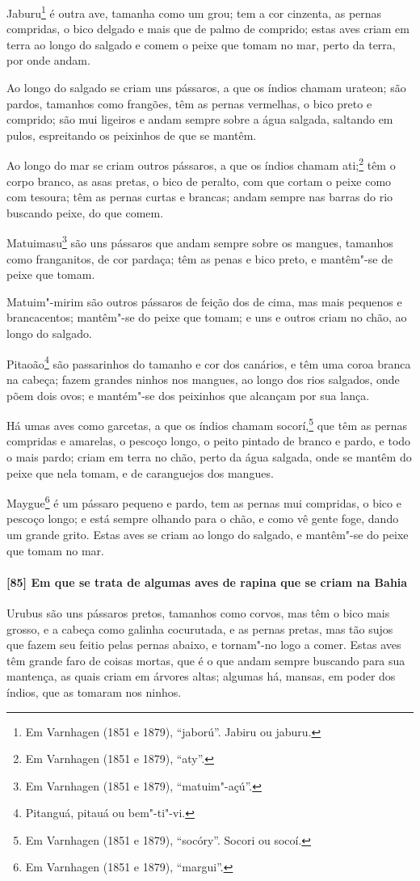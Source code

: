 \begin{linenumbers}
Jaburu\footnote{ Em Varnhagen (1851 e 1879), ``jaború''. Jabiru ou jaburu.} é outra ave,
tamanha como um grou; tem a cor cinzenta, as pernas compridas, o bico delgado e mais que
de palmo de comprido; estas aves criam em terra ao longo do salgado e comem o peixe que
tomam no mar, perto da terra, por onde andam.

Ao longo do salgado se criam uns pássaros, a que os índios chamam urateon; são pardos,
tamanhos como frangões, têm as pernas vermelhas, o bico preto e comprido; são mui ligeiros
e andam sempre sobre a água salgada, saltando em pulos, espreitando os peixinhos de que se
mantêm.

Ao longo do mar se criam outros pássaros, a que os índios chamam ati;\footnote{ Em
Varnhagen (1851 e 1879), ``aty''.} têm o corpo branco, as asas pretas, o bico de
peralto, com que cortam o peixe como com tesoura; têm as pernas curtas e brancas; andam
sempre nas barras do rio buscando peixe, do que comem.

Matuimasu\footnote{ Em Varnhagen (1851 e 1879), ``matuim"-açú''.} são uns pássaros que
andam sempre sobre os mangues, tamanhos como franganitos, de cor pardaça; têm as penas e
bico preto, e mantêm"-se de peixe que tomam.

Matuim"-mirim são outros pássaros de feição dos de cima, mas mais pequenos e brancacentos;
mantêm"-se do peixe que tomam; e uns e outros criam no chão, ao longo do salgado.

Pitaoão\footnote{ Pitanguá, pitauá ou bem"-ti"-vi.} são passarinhos do tamanho e cor dos
canários, e têm uma coroa branca na cabeça; fazem grandes ninhos nos mangues, ao longo dos
rios salgados, onde põem dois ovos; e mantém"-se dos peixinhos que alcançam por sua lança.

Há umas aves como garcetas, a que os índios chamam socorí,\footnote{ Em Varnhagen (1851 e
1879), ``socóry''. Socori ou socoí.} que têm as pernas compridas e amarelas, o pescoço
longo, o peito pintado de branco e pardo, e todo o mais pardo; criam em terra no chão,
perto da água salgada, onde se mantêm do peixe que nela tomam, e de caranguejos dos
mangues.

Maygue\footnote{ Em Varnhagen (1851 e 1879), ``margui''.} é um pássaro pequeno e pardo,
tem as pernas mui compridas, o bico e pescoço longo; e está sempre olhando para o chão, e
como vê gente foge, dando um grande grito. Estas aves se criam ao longo do salgado, e
mantêm"-se do peixe que tomam no mar.

\paragraph{[85] Em que se trata de algumas aves de rapina que se criam na Bahia}\quad
Urubus são uns pássaros pretos, tamanhos como corvos, mas têm o bico mais grosso, e a
cabeça como galinha cocurutada, e as pernas pretas, mas tão sujos que fazem seu feitio
pelas pernas abaixo, e tornam"-no logo a comer. Estas aves têm grande faro de coisas
mortas, que é o que andam sempre buscando para sua mantença, as quais criam em árvores
altas; algumas há, mansas, em poder dos índios, que as tomaram nos ninhos.


\end{linenumbers}
